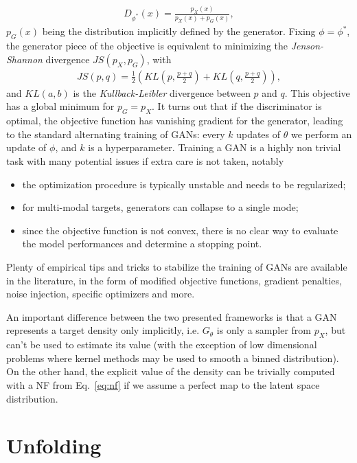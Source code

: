 %
\begin{align}
D_{\phi^{*}}(x) = \frac{p_{X}(x)}{p_{X}(x) + p_{G}(x)},
\end{align}
%
$p_{G}(x)$ being the distribution implicitly defined by the generator. 
Fixing $\phi = \phi^{*}$, the generator piece of the objective is equivalent to minimizing the \textit{Jenson-Shannon} divergence $JS(p_{X}, p_{G})$, with
%
\begin{align}
JS\left(p, q\right) = \frac{1}{2} \left(KL\left(p, \frac{p + q}{2}\right) + KL\left(q, \frac{p + q}{2}\right) \right),
\end{align}
%
and $KL(a, b)$ is the \textit{Kullback-Leibler} divergence between $p$ and $q$. This objective has a global minimum for $p_{G} = p_{X}$.
It turns out that if the discriminator is optimal, the objective function has vanishing gradient for the generator, leading to the standard alternating training of GANs: every $k$ updates of $\theta$ we perform an update of $\phi$, and $k$ is a hyperparameter.
Training a GAN is a highly non trivial task with many potential issues if extra care is not taken, notably
\begin{itemize}
\item
the optimization procedure is typically unstable and needs to be regularized;
\item
for multi-modal targets, generators can collapse to a single mode;
\item
since the objective function is not convex, there is no clear way to evaluate the model performances and determine a stopping point.
\end{itemize}
Plenty of empirical tips and tricks to stabilize the training of GANs are available in the literature, in the form of modified objective functions, gradient penalties, noise injection, specific optimizers and more.

An important difference between the two presented frameworks is that a GAN represents a target density only implicitly, i.e. $G_{\theta}$ is only a sampler from $p_{X}$, but can't be used to estimate its value (with the exception of low dimensional problems where kernel methods may be used to smooth a binned distribution). On the other hand, the explicit value of the density can be trivially computed with a NF from Eq.~\ref{eq:nf} if we assume a perfect map to the latent space distribution.

\section{Unfolding}

